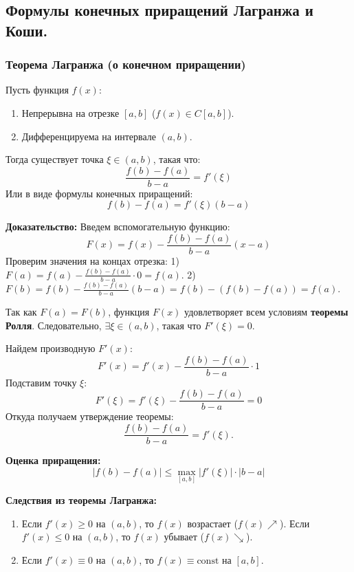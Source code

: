 \subsection{Формулы конечных приращений Лагранжа и Коши.}

\subsubsection*{Теорема Лагранжа (о конечном приращении)}

\begin{tcolorbox}[title=Теорема L (Лагранжа)]
    Пусть функция $f(x)$:
    \begin{enumerate}
        \item Непрерывна на отрезке $[a, b]$ ($f(x) \in C[a, b]$).
        \item Дифференцируема на интервале $(a, b)$.
    \end{enumerate}
    Тогда существует точка $\xi \in (a, b)$, такая что:
    \[ \frac{f(b) - f(a)}{b - a} = f'(\xi) \]
    Или в виде формулы конечных приращений:
    \[ f(b) - f(a) = f'(\xi)(b - a) \]
\end{tcolorbox}

\textbf{Доказательство:}
Введем вспомогательную функцию:
\[ F(x) = f(x) - \frac{f(b)-f(a)}{b-a}(x-a) \]
Проверим значения на концах отрезка:
1) $F(a) = f(a) - \frac{f(b)-f(a)}{b-a} \cdot 0 = f(a)$.
2) $F(b) = f(b) - \frac{f(b)-f(a)}{b-a}(b-a) = f(b) - (f(b) - f(a)) = f(a)$.

Так как $F(a) = F(b)$, функция $F(x)$ удовлетворяет всем условиям \textbf{теоремы Ролля}.
Следовательно, $\exists \xi \in (a, b)$, такая что $F'(\xi) = 0$.

Найдем производную $F'(x)$:
\[ F'(x) = f'(x) - \frac{f(b)-f(a)}{b-a} \cdot 1 \]
Подставим точку $\xi$:
\[ F'(\xi) = f'(\xi) - \frac{f(b)-f(a)}{b-a} = 0 \]
Откуда получаем утверждение теоремы:
\[ \frac{f(b)-f(a)}{b-a} = f'(\xi). \]

\textbf{Оценка приращения:}
\[ |f(b) - f(a)| \le \max_{[a, b]} |f'(\xi)| \cdot |b - a| \]

\textbf{Следствия из теоремы Лагранжа:}
\begin{enumerate}
    \item Если $f'(x) \ge 0$ на $(a, b)$, то $f(x)$ возрастает ($f(x) \nearrow$).
    Если $f'(x) \le 0$ на $(a, b)$, то $f(x)$ убывает ($f(x) \searrow$).
    \item Если $f'(x) \equiv 0$ на $(a, b)$, то $f(x) \equiv \text{const}$ на $[a, b]$.
\end{enumerate}

